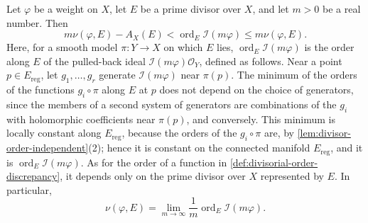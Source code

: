 \begin{corollary}\label{cor:divisorial-lelong-ideal-recovery}
Let $\varphi$ be a weight on $X$, let $E$ be a prime divisor over $X$, and let $m>0$ be a real number. Then
\begin{equation}\label{eq:divisorial-multiplier-order-bounds}
 m\nu(\varphi,E)-A_X(E)
      <\operatorname{ord}_E\mathcal I(m\varphi)
      \leq m\nu(\varphi,E).
\end{equation}
Here, for a smooth model $\pi\colon Y\to X$ on which $E$ lies, $\operatorname{ord}_E\mathcal I(m\varphi)$ is the order along $E$ of the pulled-back ideal $\mathcal I(m\varphi)\mathcal O_Y$, defined as follows. Near a point $p\in E_{\mathrm{reg}}$, let $g_1,\ldots,g_r$ generate $\mathcal I(m\varphi)$ near $\pi(p)$. The minimum of the orders of the functions $g_i\circ\pi$ along $E$ at $p$ does not depend on the choice of generators, since the members of a second system of generators are combinations of the $g_i$ with holomorphic coefficients near $\pi(p)$, and conversely. This minimum is locally constant along $E_{\mathrm{reg}}$, because the orders of the $g_i\circ\pi$ are, by \cref{lem:divisor-order-independent}(2); hence it is constant on the connected manifold $E_{\mathrm{reg}}$, and it is $\operatorname{ord}_E\mathcal I(m\varphi)$. As for the order of a function in \cref{def:divisorial-order-discrepancy}, it depends only on the prime divisor over $X$ represented by $E$. In particular,
\[
 \nu(\varphi,E)=\lim_{m\to\infty}\frac1m
                           \operatorname{ord}_E\mathcal I(m\varphi).
\]
\end{corollary}
